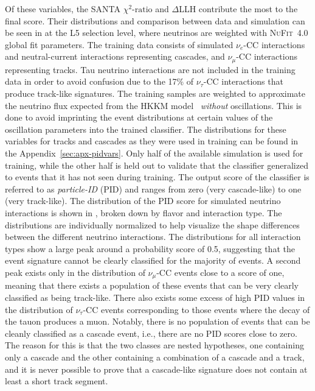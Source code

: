 Of these variables, the SANTA $\chi^2\textrm{-ratio}$ and $\Delta$LLH contribute the most to the final score.
Their distributions and comparison between data and simulation can be seen in  at the L5 selection level, where neutrinos are weighted with \textsc{NuFit}~4.0\cite{nufit40} global fit parameters.
The training data consists of simulated $\nu_e$-CC interactions and neutral-current interactions representing cascades, and $\nu_\mu$-CC interactions representing tracks.
Tau neutrino interactions are not included in the training data in order to avoid confusion due to the 17\% of $\nu_\tau$-CC interactions that produce track-like signatures.
The training samples are weighted to approximate the neutrino flux expected from the HKKM model~ \emph{without} oscillations.
This is done to avoid imprinting the event distributions at certain values of the oscillation parameters into the trained classifier.
The distributions for these variables for tracks and cascades as they were used in training can be found in the Appendix~\ref{sec:apx-pidvars}.
Only half of the available simulation is used for training, while the other half is held out to validate that the classifier generalized to events that it has not seen during training.
The output score of the classifier is referred to as \emph{particle-ID} (PID) and ranges from zero (very cascade-like) to one (very track-like).
The distribution of the PID score for simulated neutrino interactions is shown in , broken down by flavor and interaction type.
The distributions are individually normalized to help visualize the shape differences between the different neutrino interactions.
The distributions for all interaction types show a large peak around a probability score of 0.5, suggesting that the event signature cannot be clearly classified for the majority of events.
A second peak exists only in the distribution of $\nu_\mu$-CC events close to a score of one, meaning that there exists a population of these events that can be very clearly classified as being track-like.
There also exists some excess of high PID values in the distribution of $\nu_\tau$-CC events corresponding to those events where the decay of the tauon produces a muon.
Notably, there is no population of events that can be cleanly classified as a cascade event, i.e., there are no PID scores close to zero.
The reason for this is that the two classes are nested hypotheses, one containing only a cascade and the other containing a combination of a cascade and a track, and it is never possible to prove that a cascade-like signature does not contain at least a short track segment.
